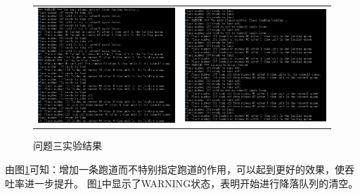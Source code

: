 \documentclass[12pt,UTF8]{ctexart}
\begin{document}
\begin{spacing}{1.4}
\begin{figure}[H]
	\centering
	\begin{tabular}{cc}
	\includegraphics[width=0.5\linewidth]{fig/exp_30.PNG} &
	\includegraphics[width=0.5\linewidth]{fig/exp_31.PNG}
	\end{tabular}
	\caption{问题三实验结果}
	\label{fig:3}
\end{figure}
由图\ref{fig:3}可知：增加一条跑道而不特别指定跑道的作用，可以起到更好的效果，使吞吐率进一步提升。
图\ref{fig:3}中显示了WARNING状态，表明开始进行降落队列的清空。


\end{spacing}
\end{document}
